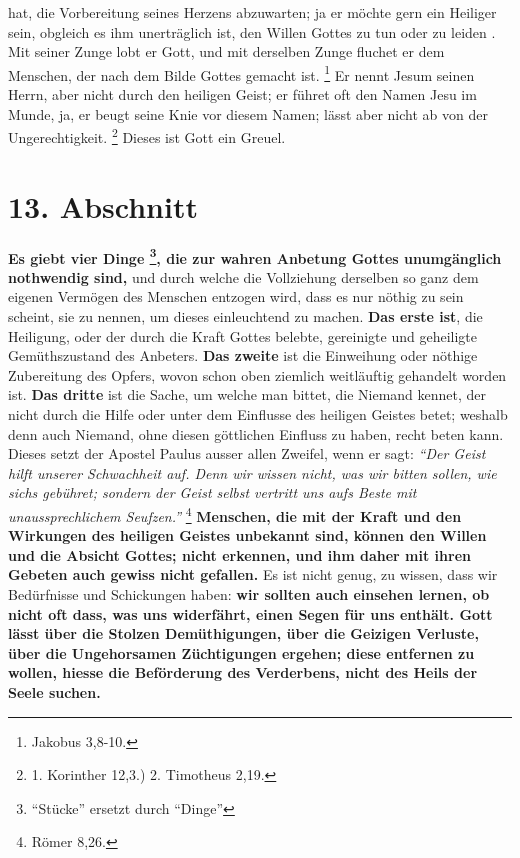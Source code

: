 hat, die
Vorbereitung seines Herzens abzuwarten; ja er möchte gern ein Heiliger
 sein,
obgleich es ihm unerträglich ist, den Willen Gottes zu tun  oder zu leiden . Mit
seiner Zunge lobt er Gott, und mit derselben Zunge fluchet er dem Menschen, der
nach dem Bilde Gottes gemacht ist.
\footnote{Jakobus 3,8-10.}
 Er nennt Jesum
seinen Herrn, aber nicht durch den heiligen Geist; er führet oft den Namen
Jesu im Munde, ja, er beugt seine Knie vor diesem Namen; lässt aber nicht ab
von der Ungerechtigkeit. 
\footnote{1. Korinther 12,3.) 2. Timotheus 2,19.}
Dieses ist Gott ein 
Greuel.

\section{13. Abschnitt} \label{kap6_ab13}
 \textbf{Es giebt vier Dinge
\footnote{"`Stücke"' ersetzt durch "`Dinge"'}, die zur wahren Anbetung Gottes
unumgänglich
nothwendig
sind,} und durch welche die Vollziehung derselben so ganz dem eigenen Vermögen
des Menschen entzogen wird, dass es nur nöthig zu sein scheint, sie zu nennen,
um dieses einleuchtend zu machen. \textbf{Das erste ist}, die Heiligung, oder
der durch
die Kraft Gottes belebte, gereinigte und geheiligte Gemüthszustand des Anbeters.
\textbf{Das zweite} ist die Einweihung oder nöthige Zubereitung des Opfers,
wovon schon
oben ziemlich weitläuftig gehandelt worden ist. \textbf{Das dritte} ist die
Sache, um
welche man bittet, die Niemand kennet, der nicht durch die Hilfe oder unter dem
Einflusse des heiligen Geistes  betet; weshalb denn auch
Niemand, ohne diesen
göttlichen Einfluss zu haben, recht beten kann. Dieses setzt der Apostel
Paulus ausser allen Zweifel, wenn er sagt:
\textit{"`Der Geist hilft unserer
Schwachheit auf. Denn wir wissen nicht, was wir bitten sollen, wie sichs
gebühret; sondern der Geist selbst vertritt uns  aufs Beste mit
unaussprechlichem Seufzen."'}
\footnote{Römer 8,26.}
\textbf{Menschen, die mit der
Kraft
und den Wirkungen des heiligen Geistes unbekannt sind, können den Willen und die
Absicht Gottes; nicht erkennen, und ihm daher mit ihren Gebeten auch gewiss
nicht gefallen.} Es ist nicht genug, zu wissen, dass wir Bedürfnisse und
Schickungen haben:  \textbf{wir sollten auch einsehen
lernen, ob nicht oft dass,
was uns
widerfährt, einen Segen  für uns enthält. Gott lässt über die
Stolzen
Demüthigungen, über die Geizigen Verluste, über die
Ungehorsamen Züchtigungen
ergehen; diese entfernen zu wollen, hiesse die Beförderung des Verderbens, nicht
des Heils der Seele suchen.}

